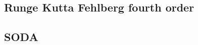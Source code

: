\subsection{Runge Kutta Fehlberg fourth order}
\label{subsec:runge-kutta-fehlberg}

\subsection{SODA}
\label{subsec:soda}




